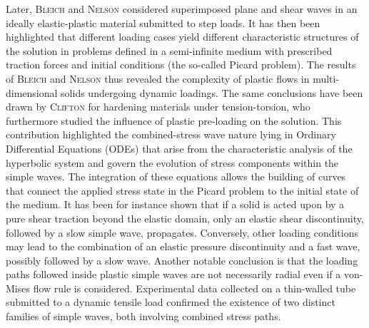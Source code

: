 %
Later, \textsc{Bleich} and \textsc{Nelson} \cite{Bleich} considered superimposed plane and shear waves in an ideally elastic-plastic material submitted to step loads.
It has then been highlighted that different loading cases yield different characteristic structures of the solution in problems defined in a semi-infinite medium with prescribed traction forces and initial conditions (the so-called Picard problem).
The results of \textsc{Bleich} and \textsc{Nelson} thus revealed the complexity of plastic flows in multi-dimensional solids undergoing dynamic loadings.
The same conclusions have been drawn by \textsc{Clifton} \cite{Clifton} for hardening materials under tension-torsion, who furthermore studied the influence of plastic pre-loading on the solution.
This contribution highlighted the combined-stress wave nature lying in Ordinary Differential Equations (ODEs) that arise from the characteristic analysis of the hyperbolic system and govern the evolution of stress components within the simple waves.
The integration of these equations allows the building of curves that connect the applied stress state in the Picard problem to the initial state of the medium.
It has been for instance shown that if a solid is acted upon by a pure shear traction beyond the elastic domain, only an elastic shear discontinuity, followed by a slow simple wave, propagates.
Conversely, other loading conditions may lead to the combination of an elastic pressure discontinuity and a fast wave, possibly followed by a slow wave.
Another notable conclusion is that the loading paths followed inside plastic simple waves are not necessarily radial even if a von-Mises flow rule is considered.
Experimental data collected on a thin-walled tube submitted to a dynamic tensile load \cite{Clifton_exp,Clifton_exp2} confirmed the existence of two distinct families of  simple waves, both involving combined stress paths.
